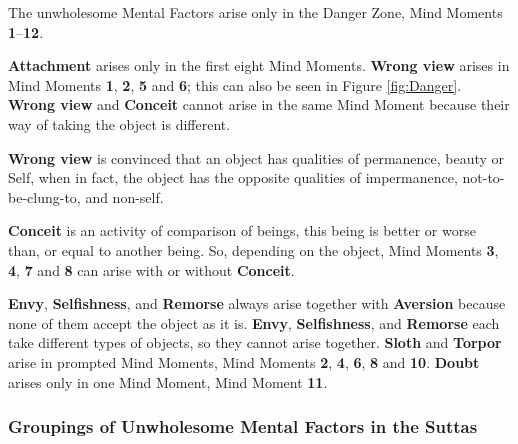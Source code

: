 The unwholesome Mental Factors arise only in the Danger Zone, Mind Moments \textbf{1}--\textbf{12}.

\textbf{Attachment} arises only in the first eight Mind Moments. \textbf{Wrong view} arises in Mind Moments \textbf{1}, \textbf{2}, \textbf{5} and \textbf{6}; this can also be seen in Figure \ref{fig:Danger}. \textbf{Wrong view} and \textbf{Conceit} cannot arise in the same Mind Moment because their way of taking the object is different. 

\textbf{Wrong view} is convinced that an object has qualities of permanence, beauty or Self, when in fact, the object has the opposite qualities of impermanence, not-to-be-clung-to, and non-self. 

\textbf{Conceit} is an activity of comparison of beings, this being is better or worse than, or equal to another being. So, depending on the object, Mind Moments \textbf{3}, \textbf{4}, \textbf{7} and \textbf{8} can arise with or without \textbf{Conceit}. 

\pagebreak

\textbf{Envy}, \textbf{Selfishness}, and \textbf{Remorse} always arise together with \textbf{Aversion} because none of them accept the object as it is. \textbf{Envy}, \textbf{Selfishness}, and \textbf{Remorse} each take different types of objects, so they cannot arise together. \textbf{Sloth} and \textbf{Torpor} arise in prompted Mind Moments, Mind Moments \textbf{2}, \textbf{4}, \textbf{6}, \textbf{8} and \textbf{10}. \textbf{Doubt} arises only in one Mind Moment, Mind Moment \textbf{11}.

\subsubsection*{Groupings of Unwholesome Mental Factors in the Suttas}

